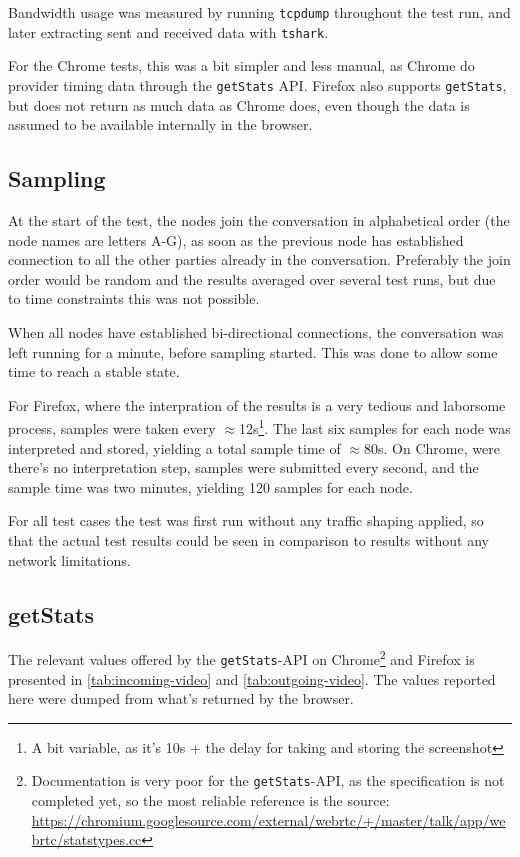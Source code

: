 Bandwidth usage was measured by running \texttt{tcpdump} throughout the test run, and later extracting sent and received data with \texttt{tshark}.

For the Chrome tests, this was a bit simpler and less manual, as Chrome do provider timing data through the \texttt{getStats} API. Firefox also supports \texttt{getStats}, but does not return as much data as Chrome does, even though the data is assumed to be available internally in the browser.


\subsection{Sampling}

At the start of the test, the nodes join the conversation in alphabetical order (the node names are letters A-G), as soon as the previous node has established connection to all the other parties already in the conversation. Preferably the join order would be random and the results averaged over several test runs, but due to time constraints this was not possible.

When all nodes have established bi-directional connections, the conversation was left running for a minute, before sampling started. This was done to allow some time to reach a stable state.

For Firefox, where the interpration of the results is a very tedious and laborsome process, samples were taken every $\approx$12s\footnote{A bit variable, as it's 10s + the delay for taking and storing the screenshot}. The last six samples for each node was interpreted and stored, yielding a total sample time of $\approx$80s. On Chrome, were there's no interpretation step, samples were submitted every second, and the sample time was two minutes, yielding 120 samples for each node.

For all test cases the test was first run without any traffic shaping applied, so that the actual test results could be seen in comparison to results without any network limitations.


\subsection{getStats}

The relevant values offered by the \texttt{getStats}-API on Chrome\footnote{Documentation is very poor for the \texttt{getStats}-API, as the specification is not completed yet, so the most reliable reference is the source: \url{https://chromium.googlesource.com/external/webrtc/+/master/talk/app/webrtc/statstypes.cc}} and Firefox is presented in \autoref{tab:incoming-video} and \autoref{tab:outgoing-video}. The values reported here were dumped from what's returned by the browser.

